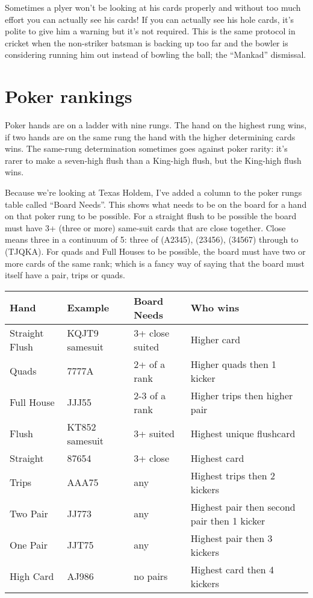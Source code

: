 Sometimes a plyer won't be looking at his cards properly and without
too much effort you can actually see his cards! If
you can actually see his hole cards, it's polite to give him a
warning but it's not required. This is the same protocol in cricket
when the non-striker batsman is backing up too far and the bowler is
considering running him out instead of bowling the ball; the
``Mankad'' dismissal.

\section{Poker rankings}

Poker hands are on a ladder with nine rungs. The hand on
the highest rung wins, if two hands are on the same rung the hand with
the higher determining cards wins. The same-rung determination
sometimes goes against poker rarity: it's rarer to make a seven-high
flush than a King-high flush, but the King-high flush wins.

Because we're looking at Texas Holdem, I've added a column to the
poker rungs table called ``Board Needs''. This shows what needs to be
on the board for a hand on that poker rung to be possible. For a
straight flush to be possible the board must have 3+ (three or more)
same-suit cards that are close together. Close means three in a
continuum of 5: three of (A2345), (23456), (34567) through to
(TJQKA). For quads and Full Houses to be possible, the board must have
two or more cards of the same rank; which is a fancy way of saying
that the board must itself have a pair, trips or quads.

\begin{tabular}{|l|l|l|l|} \hline
Hand            & Example   & Board Needs    & Who wins \\ \hline
Straight Flush  & KQJT9 samesuit     & 3+ close suited &
Higher card \\ \hline
Quads           & 7777A     & 2+ of a rank   & Higher quads then
1 kicker \\ \hline
Full House      & JJJ55     & 2-3 of a rank  & Higher trips then
higher pair \\ \hline
Flush           & KT852 samesuit & 3+ suited & Highest unique flushcard
\\ \hline
Straight        & 87654     & 3+ close       & Highest card \\ \hline
Trips           & AAA75     & any            & Highest trips then 2
kickers \\ \hline
Two Pair        & JJ773     & any            & Highest pair then
second pair then 1 kicker \\ \hline
One Pair        & JJT75     & any            & Highest pair then 3
kickers \\ \hline
High Card       & AJ986     & no pairs       & Highest card then 4
kickers \\ \hline
\end{tabular}

